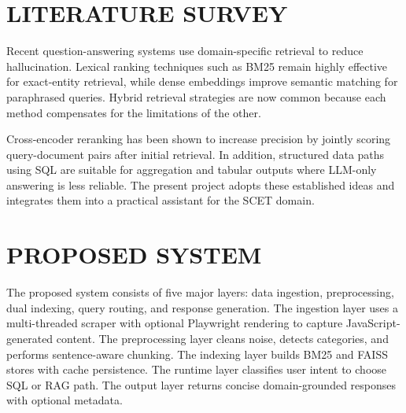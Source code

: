 \documentclass[12pt,a4paper]{report}
\begin{document}
\chapter{LITERATURE SURVEY}
\thispagestyle{fancy}
\onehalfspacing

\hspace*{1cm}Recent question-answering systems use domain-specific retrieval to reduce hallucination. Lexical ranking techniques such as BM25 remain highly effective for exact-entity retrieval, while dense embeddings improve semantic matching for paraphrased queries. Hybrid retrieval strategies are now common because each method compensates for the limitations of the other.

\hspace*{1cm}Cross-encoder reranking has been shown to increase precision by jointly scoring query-document pairs after initial retrieval. In addition, structured data paths using SQL are suitable for aggregation and tabular outputs where LLM-only answering is less reliable. The present project adopts these established ideas and integrates them into a practical assistant for the SCET domain.

\chapter{PROPOSED SYSTEM}
\thispagestyle{fancy}
\onehalfspacing

\hspace*{1cm}The proposed system consists of five major layers: data ingestion, preprocessing, dual indexing, query routing, and response generation. The ingestion layer uses a multi-threaded scraper with optional Playwright rendering to capture JavaScript-generated content. The preprocessing layer cleans noise, detects categories, and performs sentence-aware chunking. The indexing layer builds BM25 and FAISS stores with cache persistence. The runtime layer classifies user intent to choose SQL or RAG path. The output layer returns concise domain-grounded responses with optional metadata.
\end{document}
